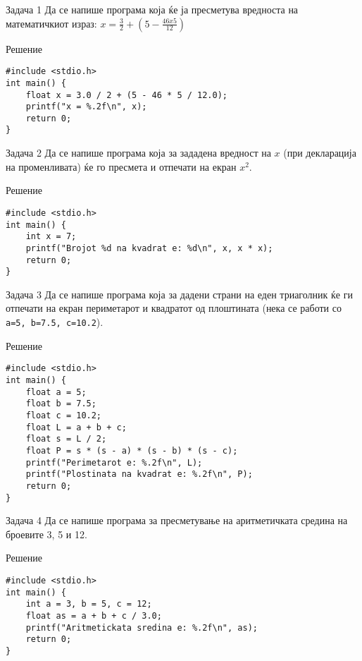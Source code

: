 \begin{frame}[fragile]{Задача 1}
    Да се напише програма која ќе ја пресметува вредноста на математичкиот израз:
    $ x = \frac{3}{2} + (5 - \frac{46 x 5}{12})$
    \begin{exampleblock}{Решение}
\begin{lstlisting}
#include <stdio.h>
int main() {
    float x = 3.0 / 2 + (5 - 46 * 5 / 12.0);
    printf("x = %.2f\n", x);
    return 0;
}
\end{lstlisting}
    \end{exampleblock}
\end{frame}

\begin{frame}[fragile]{Задача 2}
Да се напише програма која за зададена вредност на $ x $ (при декларација на променливата) ќе го пресмета и отпечати на екран $ x^2 $.
    \begin{exampleblock}{Решение}
\begin{lstlisting}
#include <stdio.h>
int main() {
    int x = 7;
    printf("Brojot %d na kvadrat e: %d\n", x, x * x);
    return 0;
}
\end{lstlisting}
    \end{exampleblock}
\end{frame}

\begin{frame}[fragile]{Задача 3}
Да се напише програма која за дадени страни на еден триаголник ќе ги отпечати на екран периметарот 
и квадратот од плоштината (нека се работи со \texttt{a=5, b=7.5, c=10.2}).
    \begin{exampleblock}{Решение}
        \begin{lstlisting}
#include <stdio.h>
int main() {
    float a = 5;
    float b = 7.5;
    float c = 10.2;
    float L = a + b + c;
    float s = L / 2;
    float P = s * (s - a) * (s - b) * (s - c);
    printf("Perimetarot e: %.2f\n", L);
    printf("Plostinata na kvadrat e: %.2f\n", P);
    return 0;
}
\end{lstlisting}
    \end{exampleblock}
\end{frame}

\begin{frame}[fragile]{Задача 4}
Да се напише програма за пресметување на аритметичката средина на броевите 3, 5 и 12.
    \begin{exampleblock}{Решение}
\begin{lstlisting}
#include <stdio.h>
int main() {
    int a = 3, b = 5, c = 12;
    float as = a + b + c / 3.0;
    printf("Aritmetickata sredina e: %.2f\n", as);
    return 0;
}
\end{lstlisting}
    \end{exampleblock}
\end{frame}

